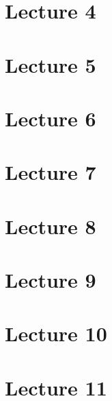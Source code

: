 \documentclass[11pt]{article}
\begin{document}
\part{Lecture 4}

    

\part{Lecture 5}

    

\part{Lecture 6}

    

\part{Lecture 7}

    

\part{Lecture 8}

    

\part{Lecture 9}

    

\part{Lecture 10}

    

\part{Lecture 11}

    
\end{document}
